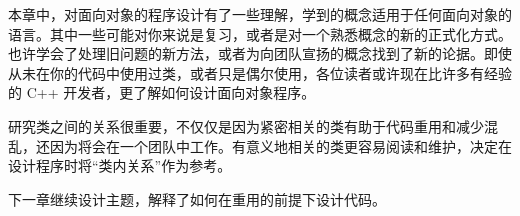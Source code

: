 本章中，对面向对象的程序设计有了一些理解，学到的概念适用于任何面向对象的语言。其中一些可能对你来说是复习，或者是对一个熟悉概念的新的正式化方式。也许学会了处理旧问题的新方法，或者为向团队宣扬的概念找到了新的论据。即使从未在你的代码中使用过类，或者只是偶尔使用，各位读者或许现在比许多有经验的 C++ 开发者，更了解如何设计面向对象程序。

研究类之间的关系很重要，不仅仅是因为紧密相关的类有助于代码重用和减少混乱，还因为将会在一个团队中工作。有意义地相关的类更容易阅读和维护，决定在设计程序时将“类内关系”作为参考。

下一章继续设计主题，解释了如何在重用的前提下设计代码。